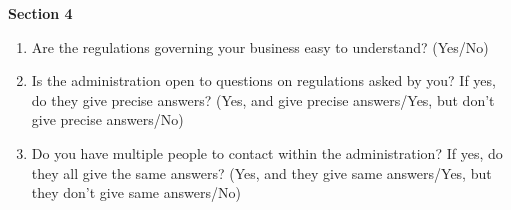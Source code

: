 \documentclass[a4paper, 12pt]{article}
\begin{document}
\begin{mdframed}[backgroundcolor=gray!20]
\begin{enumerate}[noitemsep]
\end{enumerate}
\textbf {Section 4}
\begin{enumerate}[noitemsep]
\item Are the regulations governing your business easy to understand? (Yes/No)
\item Is the administration open to questions on regulations asked by you? If yes, do they give precise answers? (Yes, and give precise answers/Yes, but don’t give precise answers/No)
\item Do you have multiple people to contact within the administration? If yes, do they all give the same answers? (Yes, and they give same answers/Yes, but they don’t give same 
answers/No)
\end{enumerate} 
\end{mdframed}

\small
\end{document}
